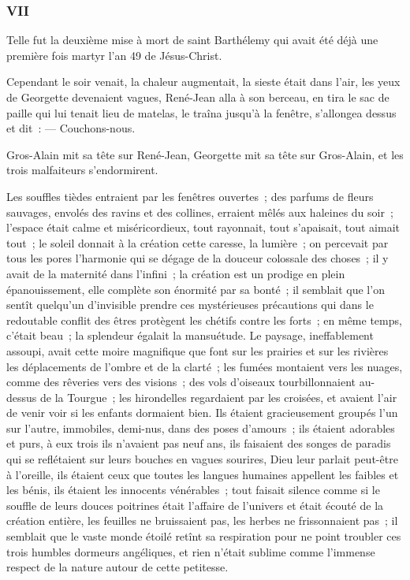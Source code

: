 \documentclass[french,twoside]{book} %
\begin{document}
 \subsubsection[{VII}]{VII}
\label{p3l3c7}
\noindent Telle fut la deuxième mise à mort de saint Barthélemy qui avait été déjà une première fois martyr l’an 49 de Jésus-Christ.\par
Cependant le soir venait, la chaleur augmentait, la sieste était dans l’air, les yeux de Georgette devenaient vagues, René-Jean alla à son berceau, en tira le sac de paille qui lui tenait lieu de matelas, le traîna jusqu’à la fenêtre, s’allongea dessus et dit : — Couchons-nous.\par
Gros-Alain mit sa tête sur René-Jean, Georgette mit sa tête sur Gros-Alain, et les trois malfaiteurs s’endormirent.\par
Les souffles tièdes entraient par les fenêtres ouvertes ; des parfums de fleurs sauvages, envolés des ravins et des collines, erraient mêlés aux haleines du soir ; l’espace était calme et miséricordieux, tout rayonnait, tout s’apaisait, tout aimait tout ; le soleil donnait à la création cette caresse, la lumière ; on percevait par tous les pores l’harmonie qui se dégage de la douceur colossale des choses ; il y avait de la maternité dans l’infini ; la création est un prodige en plein épanouissement, elle complète son énormité par sa bonté ; il semblait que l’on sentît quelqu’un d’invisible prendre ces mystérieuses précautions qui dans le  redoutable conflit des êtres protègent les chétifs contre les forts ; en même temps, c’était beau ; la splendeur égalait la mansuétude. Le paysage, ineffablement assoupi, avait cette moire magnifique que font sur les prairies et sur les rivières les déplacements de l’ombre et de la clarté ; les fumées montaient vers les nuages, comme des rêveries vers des visions ; des vols d’oiseaux tourbillonnaient au-dessus de la Tourgue ; les hirondelles regardaient par les croisées, et avaient l’air de venir voir si les enfants dormaient bien. Ils étaient gracieusement groupés l’un sur l’autre, immobiles, demi-nus, dans des poses d’amours ; ils étaient adorables et purs, à eux trois ils n’avaient pas neuf ans, ils faisaient des songes de paradis qui se reflétaient sur leurs bouches en vagues sourires, Dieu leur parlait peut-être à l’oreille, ils étaient ceux que toutes les langues humaines appellent les faibles et les bénis, ils étaient les innocents vénérables ; tout faisait silence comme si le souffle de leurs douces poitrines était l’affaire de l’univers et était écouté de la création entière, les feuilles ne bruissaient pas, les herbes ne frissonnaient pas ; il semblait que le vaste monde étoilé retînt sa respiration pour ne point troubler ces trois humbles dormeurs angéliques, et rien n’était sublime comme l’immense respect de la nature autour de cette petitesse.\par
\end{document}
